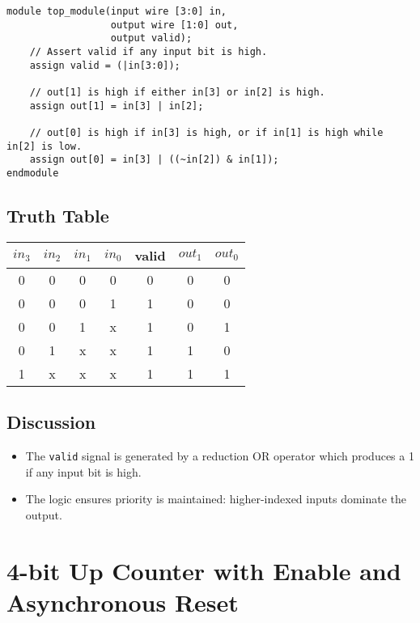 \documentclass[11pt]{article}
\begin{document}
\begin{lstlisting}[style=verilogstyle, caption={4-to-2 Priority Encoder}]
module top_module(input wire [3:0] in, 
                  output wire [1:0] out, 
                  output valid);
    // Assert valid if any input bit is high.
    assign valid = (|in[3:0]);
    
    // out[1] is high if either in[3] or in[2] is high.
    assign out[1] = in[3] | in[2];
    
    // out[0] is high if in[3] is high, or if in[1] is high while in[2] is low.
    assign out[0] = in[3] | ((~in[2]) & in[1]);
endmodule
\end{lstlisting}

\subsection{Truth Table}

\begin{center}
\begin{tabular}{|c|c|c|c||c|c|c|}
\hline
\(in_3\) & \(in_2\) & \(in_1\) & \(in_0\) & valid & \(out_1\) & \(out_0\) \\
\hline
0 & 0 & 0 & 0 & 0 & 0 & 0 \\
0 & 0 & 0 & 1 & 1 & 0 & 0 \\
0 & 0 & 1 & x & 1 & 0 & 1 \\
0 & 1 & x & x & 1 & 1 & 0 \\
1 & x & x & x & 1 & 1 & 1 \\
\hline
\end{tabular}
\end{center}

\subsection{Discussion}
\begin{itemize}
    \item The \texttt{valid} signal is generated by a reduction OR operator which produces a 1 if any input bit is high.
    \item The logic ensures priority is maintained: higher-indexed inputs dominate the output.
\end{itemize}

\section{4-bit Up Counter with Enable and Asynchronous Reset}
\end{document}
